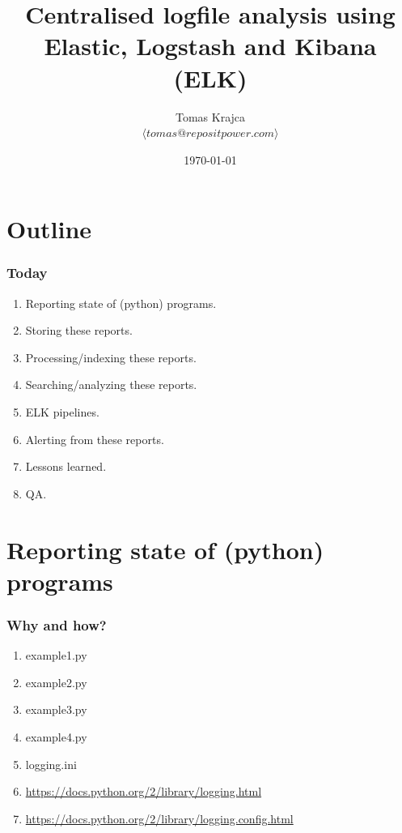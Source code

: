 \documentclass[13pt, ignorenonframetext]{beamer}
\institute[PUG@Canberra]{PUG Meetup   \\
Canberra}
\title[Centralised logfile analysis using ELK]{Centralised logfile analysis using Elastic, Logstash and Kibana (ELK)}
\author[Tomas Krajca]{Tomas Krajca \\{\tiny $\langle tomas@repositpower.com \rangle$}}
\date{\today}
\begin{document}
\begin{frame}[plain]
	\titlepage
\end{frame}


\section{Outline}
\frame
{
  \frametitle{Today}
  \begin{enumerate}
  \item Reporting state of (python) programs.
  \item Storing these reports.
  \item Processing/indexing these reports.
  \item Searching/analyzing these reports.
  \item ELK pipelines.
  \item Alerting from these reports.
  \item Lessons learned.
  \item QA.
  \end{enumerate}
}

\section{Reporting state of (python) programs}
\begin{frame}
\frametitle{Why and how?}
\begin{enumerate}
\item example1.py
\item example2.py
\item example3.py
\item example4.py
\item logging.ini
\item \url{https://docs.python.org/2/library/logging.html}
\item \url{https://docs.python.org/2/library/logging.config.html}
\end{enumerate}
\end{frame}
\end{document}
